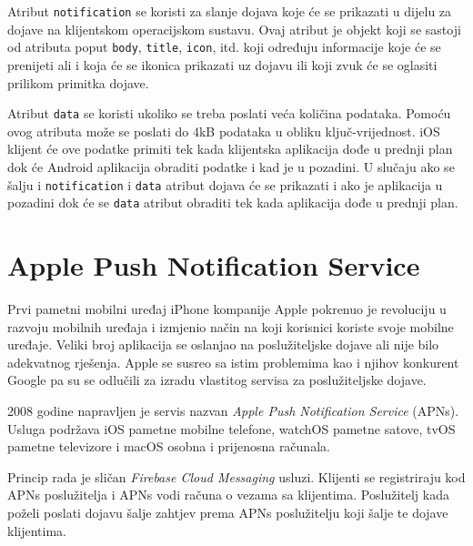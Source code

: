 \documentclass[times, utf8, zavrsni]{fer}
\begin{document}
Atribut {\tt notification} se koristi za slanje dojava koje će se prikazati u dijelu za dojave na klijentskom operacijskom sustavu. Ovaj atribut je objekt koji se sastoji od atributa poput {\tt body}, {\tt title}, {\tt icon}, itd. koji određuju informacije koje će se prenijeti ali i koja će se ikonica prikazati uz dojavu ili koji zvuk će se oglasiti prilikom primitka dojave.

Atribut {\tt data} se koristi ukoliko se treba poslati veća količina podataka. Pomoću ovog atributa može se poslati do 4kB podataka u obliku ključ-vrijednost. iOS klijent će ove podatke primiti tek kada klijentska aplikacija dođe u prednji plan dok će Android aplikacija obraditi podatke i kad je u pozadini. U slučaju ako se šalju i {\tt notification} i {\tt data} atribut dojava će se prikazati i ako je aplikacija u pozadini dok će se {\tt data} atribut obraditi tek kada aplikacija dođe u prednji plan.\citep{fcm2017}

\section{Apple Push Notification Service}

Prvi pametni mobilni uređaj iPhone kompanije Apple pokrenuo je revoluciju u razvoju mobilnih uređaja i izmjenio način na koji korisnici koriste svoje mobilne uređaje. Veliki broj aplikacija se oslanjao na poslužiteljske dojave ali nije bilo adekvatnog rješenja. Apple se susreo sa istim problemima kao i njihov konkurent Google pa su se odlučili za izradu vlastitog servisa za poslužiteljske dojave.

2008 godine napravljen je servis nazvan {\em Apple Push Notification Service} (APNs). Usluga podržava iOS pametne mobilne telefone, watchOS pametne satove, tvOS pametne televizore i macOS osobna i prijenosna računala.

Princip rada je sličan {\em Firebase Cloud Messaging} usluzi. Klijenti se registriraju kod APNs poslužitelja i APNs vodi računa o vezama sa klijentima. Poslužitelj kada poželi poslati dojavu šalje zahtjev prema APNs poslužitelju koji šalje te dojave klijentima.
\end{document}

